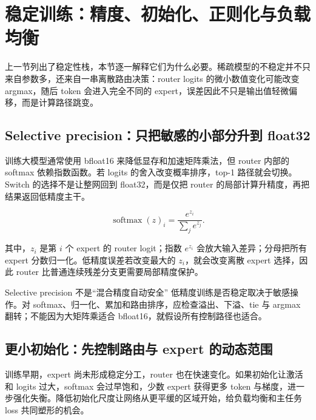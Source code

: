 \section{稳定训练：精度、初始化、正则化与负载均衡}

上一节列出了稳定性栈，本节逐一解释它们为什么必要。稀疏模型的不稳定并不只来自参数多，还来自一串离散路由决策：router logits 的微小数值变化可能改变 argmax，随后 token 会进入完全不同的 expert，误差因此不只是输出值轻微偏移，而是计算路径跳变。

\subsection{Selective precision：只把敏感的小部分升到 float32}

训练大模型通常使用 bfloat16 来降低显存和加速矩阵乘法，但 router 内部的 softmax 依赖指数函数。若 logits 的舍入改变概率排序，top-1 路径就会切换。Switch 的选择不是让整网回到 float32，而是仅把 router 的局部计算升精度，再把结果返回低精度主干。


\[
\operatorname{softmax}(z)_i=\frac{e^{z_i}}{\sum_j e^{z_j}}.
\]

其中，$z_i$ 是第 $i$ 个 expert 的 router logit；指数 $e^{z_i}$ 会放大输入差异；分母把所有 expert 分数归一化。低精度误差若改变最大的 $z_i$，就会改变离散 expert 选择，因此 router 比普通连续残差分支更需要局部精度保护。


\begin{warningbox}{Selective precision 不是“混合精度自动安全”}
低精度训练是否稳定取决于敏感操作。对 softmax、归一化、累加和路由排序，应检查溢出、下溢、tie 与 argmax 翻转；不能因为大矩阵乘适合 bfloat16，就假设所有控制路径也适合。
\end{warningbox}

\subsection{更小初始化：先控制路由与 expert 的动态范围}

训练早期，expert 尚未形成稳定分工，router 也在快速变化。如果初始化让激活和 logits 过大，softmax 会过早饱和，少数 expert 获得更多 token 与梯度，进一步强化失衡。降低初始化尺度让网络从更平缓的区域开始，给负载均衡和主任务 loss 共同塑形的机会。

